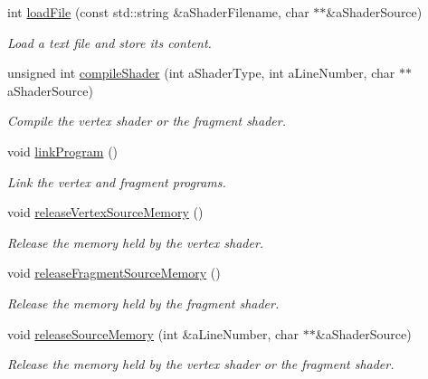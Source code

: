 \begin{DoxyCompactItemize}
\item 
int \hyperlink{class_graphics_1_1_shader_ab0bd3f48b17216e94b0ebd0c1b5acb34}{loadFile} (const std::string \&aShaderFilename, char $\ast$$\ast$\&aShaderSource)
\begin{DoxyCompactList}\small\item\em Load a text file and store its content. \end{DoxyCompactList}\item 
unsigned int \hyperlink{class_graphics_1_1_shader_aa4df5057c92cfbb8239eec2583aff5f2}{compileShader} (int aShaderType, int aLineNumber, char $\ast$$\ast$aShaderSource)
\begin{DoxyCompactList}\small\item\em Compile the vertex shader or the fragment shader. \end{DoxyCompactList}\item 
void \hyperlink{class_graphics_1_1_shader_a571cc74458a1b81170e53189944d4c90}{linkProgram} ()
\begin{DoxyCompactList}\small\item\em Link the vertex and fragment programs. \end{DoxyCompactList}\item 
void \hyperlink{class_graphics_1_1_shader_a4ca7f56e6f5a82259e0fbfb53c382892}{releaseVertexSourceMemory} ()
\begin{DoxyCompactList}\small\item\em Release the memory held by the vertex shader. \end{DoxyCompactList}\item 
void \hyperlink{class_graphics_1_1_shader_a19c19cd2977c2fa64178796c3e8de0b3}{releaseFragmentSourceMemory} ()
\begin{DoxyCompactList}\small\item\em Release the memory held by the fragment shader. \end{DoxyCompactList}\item 
void \hyperlink{class_graphics_1_1_shader_ac91ea94d90af6221d67b8f48dc8fb774}{releaseSourceMemory} (int \&aLineNumber, char $\ast$$\ast$\&aShaderSource)
\begin{DoxyCompactList}\small\item\em Release the memory held by the vertex shader or the fragment shader. \end{DoxyCompactList}\end{DoxyCompactItemize}
